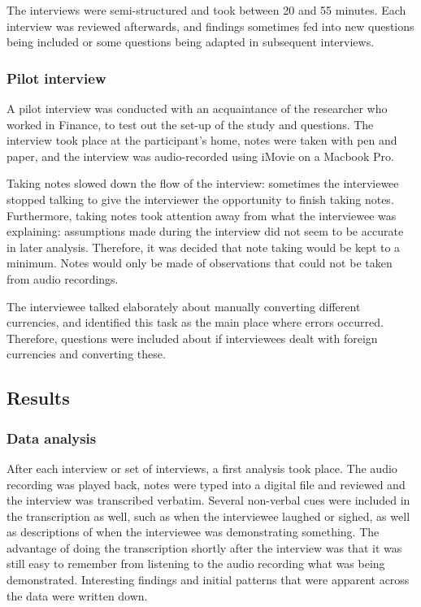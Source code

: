\documentclass[11pt,oneside]{report}
\begin{document}
The interviews were semi-structured and took between 20 and 55 minutes. Each interview was reviewed afterwards, and findings sometimes fed into new questions being included or some questions being adapted in subsequent interviews.

\subsubsection{Pilot interview}
A pilot interview was conducted with an acquaintance of the researcher who worked in Finance, to test out the set-up of the study and questions. The interview took place at the participant's home, notes were taken with pen and paper, and the interview was audio-recorded using iMovie on a Macbook Pro. 

Taking notes slowed down the flow of the interview: sometimes the interviewee stopped talking to give the interviewer the opportunity to finish taking notes. Furthermore, taking notes took attention away from what the interviewee was explaining: assumptions made during the interview did not seem to be accurate in later analysis. Therefore, it was decided that note taking would be kept to a minimum. Notes would only be made of observations that could not be taken from audio recordings.

The interviewee talked elaborately about manually converting different currencies, and identified this task as the main place where errors occurred. Therefore, questions were included about if interviewees dealt with foreign currencies and converting these. 

\subsection{Results}
\subsubsection{Data analysis}
After each interview or set of interviews, a first analysis took place. The audio recording was played back, notes were typed into a digital file and reviewed and the interview was transcribed verbatim. Several non-verbal cues were included in the transcription as well, such as when the interviewee laughed or sighed, as well as descriptions of when the interviewee was demonstrating something. The advantage of doing the transcription shortly after the interview was that it was still easy to remember from listening to the audio recording what was being demonstrated. Interesting findings and initial patterns that were apparent across the data were written down. 
\end{document}
